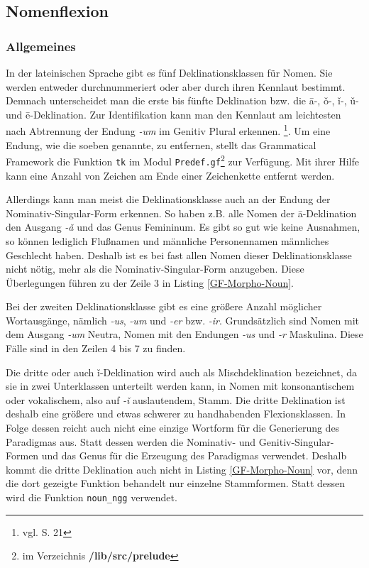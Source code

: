\subsection{Nomenflexion}
\label{subsec:nomen}
\subsubsection{Allgemeines}
In der lateinischen Sprache gibt es fünf Deklinationsklassen für Nomen. Sie werden entweder durchnummeriert oder aber durch ihren Kennlaut bestimmt. Demnach unterscheidet man die erste bis fünfte Deklination bzw. die ā-, ǒ-, ǐ-, ǔ- und ē-Deklination. Zur Identifikation kann man den Kennlaut am leichtesten nach Abtrennung der Endung \textit{-um} im Genitiv Plural erkennen. \footnote{vgl. \cite{BAYER-LINDAUER1994} S. 21}. Um eine Endung, wie die soeben genannte, zu entfernen, stellt das Grammatical Framework die Funktion \texttt{tk} im Modul \texttt{Predef.gf}\footnote{im Verzeichnis \textbf{/lib/src/prelude}} zur Verfügung. Mit ihrer Hilfe kann eine Anzahl von Zeichen am Ende einer Zeichenkette entfernt werden.\par
Allerdings kann man meist die Deklinationsklasse auch an der Endung der No\-mi\-na\-tiv-Singular-Form erkennen. So haben z.B. alle Nomen der ā-Deklination den Ausgang \textit{-ǎ} und das Genus Femininum. Es gibt so gut wie keine Ausnahmen, so können lediglich Flußnamen und männliche Personennamen männliches Geschlecht haben. Deshalb ist es bei fast allen Nomen dieser Deklinationsklasse nicht nötig, mehr als die Nominativ-Singular-Form anzugeben. Diese Überlegungen führen zu der Zeile 3 in Listing \ref{GF-Morpho-Noun}.\par
Bei der zweiten Deklinationsklasse gibt es eine größere Anzahl möglicher Wortausgänge, nämlich \textit{-us}, \textit{-um} und \textit{-er} bzw. \textit{-ir}. Grundsätzlich sind Nomen mit dem Ausgang \textit{-um} Neutra, Nomen mit den Endungen \textit{-us} und \textit{-r} Maskulina. Diese Fälle sind in den Zeilen 4 bis 7 zu finden. \par
Die dritte oder auch ǐ-Deklination wird auch als Mischdeklination bezeichnet, da sie in zwei Unterklassen unterteilt werden kann, in Nomen mit konsonantischem oder vokalischem, also auf \textit{-ǐ} auslautendem, Stamm. Die dritte Deklination ist deshalb eine größere und etwas schwerer zu handhabenden Flexionsklassen. In Folge dessen reicht auch nicht eine einzige Wortform für die Generierung des Paradigmas aus. Statt dessen werden die Nominativ- und Genitiv-Singular-Formen und das Genus für die Erzeugung des Paradigmas verwendet. Deshalb kommt die dritte Deklination auch nicht in Listing \ref{GF-Morpho-Noun} vor, denn die dort gezeigte Funktion behandelt nur einzelne Stammformen. Statt dessen wird die Funktion \texttt{noun\_ngg} verwendet.\par
